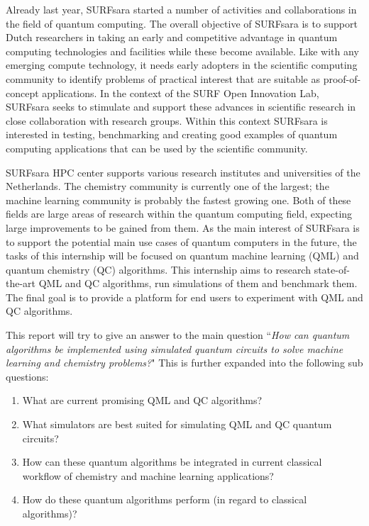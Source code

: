 \documentclass[a4paper,11pt]{article}
\begin{document}
Already last year, SURFsara started a number of activities and collaborations in the field of quantum computing.
The overall objective of SURFsara is to support Dutch researchers in taking an early and competitive advantage in quantum computing technologies and facilities while these become available.
Like with any  emerging compute technology, it needs early adopters in the scientific computing community to identify problems of practical interest that are suitable as proof-of-concept applications.
In the context of the SURF Open Innovation Lab, SURFsara seeks to stimulate and support these advances in scientific research in close collaboration with research groups.
Within this context SURFsara is interested in testing, benchmarking and creating good examples of quantum computing applications that can be used by the scientific community.

SURFsara HPC center supports various research institutes and universities of the Netherlands.
The chemistry community is currently one of the largest; the machine learning community is probably the fastest growing one.
Both of these fields are large areas of research within the quantum computing field, expecting large improvements to be gained from them.
As the main interest of SURFsara is to support the potential main use cases of quantum computers in the future, the tasks of this internship will be focused on quantum machine learning (QML) and quantum chemistry (QC) algorithms.
This internship aims to research state-of-the-art QML and QC algorithms, run simulations of them and benchmark them.
The final goal is to provide a platform for end users to experiment with QML and QC algorithms.

This report will try to give an answer to the main question ``\emph{How can quantum algorithms be implemented using simulated quantum circuits to solve machine learning and chemistry problems?}"
This is further expanded into the following sub questions:
\begin{enumerate}
	\item What are current promising QML and QC algorithms?
	\item What simulators are best suited for simulating QML and QC quantum circuits?
	\item How can these quantum algorithms be integrated in current classical workflow of chemistry and machine learning applications?
	\item How do these quantum algorithms perform (in regard to classical algorithms)?
\end{enumerate}
\end{document}
